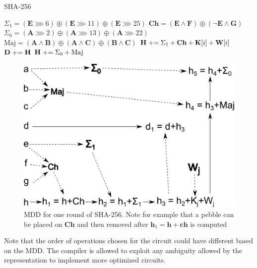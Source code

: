 \begin{algorithm}
\caption{SHA-256}
\label{alg:sha2}
\begin{algorithmic}
    \State \hspace*{1em} $\Sigma_1 = (\mathbf{E} \ggg 6) \oplus (\mathbf{E} \ggg 11) \oplus  (\mathbf{E} \ggg 25)$
    \State \hspace*{1em} $\mathbf{Ch} = (\mathbf{E} \land \mathbf{F}) \oplus ( \neg\mathbf{E}\land \mathbf{G})$
    \State \hspace*{1em} $\Sigma_0 = (\mathbf{A} \ggg 2) \oplus (\mathbf{A} \ggg 13) \oplus (\mathbf{A} \ggg 22)$
    \State \hspace*{1em} $\text{Maj} = (\mathbf{A} \land \mathbf{B}) \oplus (\mathbf{A} \land \mathbf{C}) \oplus (\mathbf{B}\land\mathbf{C})$
    \State \hspace*{1em} $\mathbf{H} \mathrel{+}= \Sigma_1 + \mathbf{Ch} + \mathbf{K}[i] + \mathbf{W}[i]$
    \State \hspace*{1em} $\mathbf{D} \mathrel{+}= \mathbf{H}$
    \State \hspace*{1em} $\mathbf{H} \mathrel{+}= \Sigma_0 + \text{Maj}$
  \EndFor
\end{algorithmic}
\end{algorithm}

\begin{figure}
      \capstart
      \centering
      \includegraphics[width=0.7\hsize]{images/sha_MDD}

      \caption{MDD for one round of SHA-256. Note for example that a pebble can
      be placed on $\mathbf{Ch}$ and then removed after $\mathbf{h}_1 = \mathbf{h}+\mathbf{ch}$ is computed}

      \label{fig:sha-MDD}
\end{figure}

Note that the order of operations chosen for the circuit could have different
based on the MDD. The compiler is allowed to exploit any ambiguity allowed by
the representation to implement more optimized circuits.

